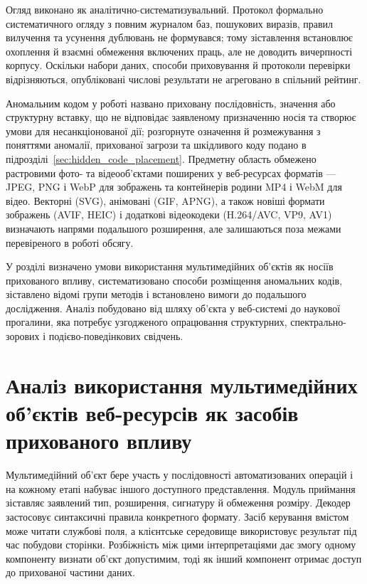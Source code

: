 Огляд виконано як аналітично-систематизувальний. Протокол формально систематичного огляду з повним журналом баз, пошукових виразів, правил вилучення та усунення дублювань не формувався; тому зіставлення встановлює охоплення й взаємні обмеження включених праць, але не доводить вичерпності корпусу. Оскільки набори даних, способи приховування й протоколи перевірки відрізняються, опубліковані числові результати не агреговано в спільний рейтинг.

Аномальним кодом у роботі названо приховану послідовність, значення або структурну вставку, що не відповідає заявленому призначенню носія та створює умови для несанкціонованої дії; розгорнуте означення й розмежування з поняттями аномалії, прихованої загрози та шкідливого коду подано в підрозділі~\ref{sec:hidden_code_placement}. Предметну область обмежено растровими фото- та відеооб’єктами поширених у веб-ресурсах форматів --- JPEG, PNG і WebP для зображень та контейнерів родини MP4 і WebM для відео. Векторні (SVG), анімовані (GIF, APNG), а також новіші формати зображень (AVIF, HEIC) і додаткові відеокодеки (H.264/AVC, VP9, AV1) визначають напрями подальшого розширення, але залишаються поза межами перевіреного в роботі обсягу.

У розділі визначено умови використання мультимедійних об’єктів як носіїв прихованого впливу, систематизовано способи розміщення аномальних кодів, зіставлено відомі групи методів і встановлено вимоги до подальшого дослідження. Аналіз побудовано від шляху об’єкта у веб-системі до наукової прогалини, яка потребує узгодженого опрацювання структурних, спектрально-зорових і подієво-поведінкових свідчень.

\section{Аналіз використання мультимедійних об’єктів веб-ресурсів як засобів прихованого впливу}
\label{sec:multimedia_threat_carrier}

Мультимедійний об’єкт бере участь у послідовності автоматизованих операцій і на кожному етапі набуває іншого доступного представлення. Модуль приймання зіставляє заявлений тип, розширення, сигнатуру й обмеження розміру. Декодер застосовує синтаксичні правила конкретного формату. Засіб керування вмістом може читати службові поля, а клієнтське середовище використовує результат під час побудови сторінки. Розбіжність між цими інтерпретаціями дає змогу одному компоненту визнати об’єкт допустимим, тоді як інший компонент отримає доступ до прихованої частини даних.

